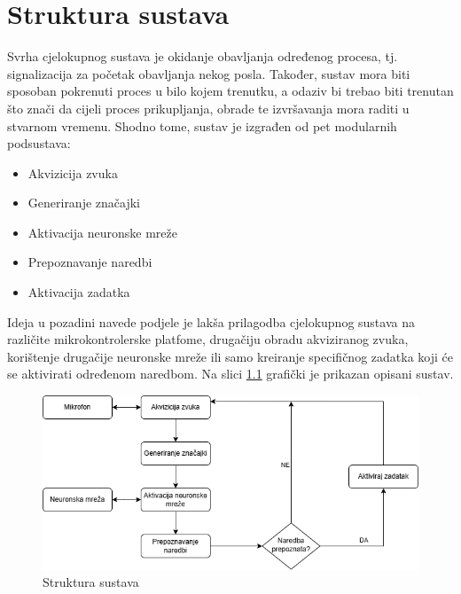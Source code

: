 \chapter{Struktura sustava}
\label{pog:struktura_sustava}

Svrha cjelokupnog sustava je okidanje obavljanja određenog procesa, tj. signalizacija
za početak obavljanja nekog posla. Također, sustav mora biti sposoban pokrenuti
proces u bilo kojem trenutku, a odaziv bi trebao biti trenutan što
znači da cijeli proces prikupljanja, obrade te izvršavanja mora raditi
u stvarnom vremenu. Shodno tome, sustav je izgrađen od pet modularnih
podsustava:

\begin{itemize}
    \item Akvizicija zvuka
    \item Generiranje značajki
    \item Aktivacija neuronske mreže
    \item Prepoznavanje naredbi
    \item Aktivacija zadatka 
\end{itemize}

Ideja u pozadini navede podjele je lakša prilagodba cjelokupnog
sustava na različite mikrokontrolerske platfome, drugačiju obradu
akviziranog zvuka, korištenje drugačije neuronske mreže ili samo 
kreiranje specifičnog zadatka koji će se aktivirati određenom naredbom.
Na slici \ref{pic:struktura_sustava} grafički je prikazan opisani sustav.

\begin{figure}[htb]
    \centering
    \includegraphics[width=0.6\linewidth]{Chapters/struktura_sustava/struktura_sustava.png} 
    \caption{Struktura sustava \cite{flowchart}}
    \label{pic:struktura_sustava}
\end{figure}






